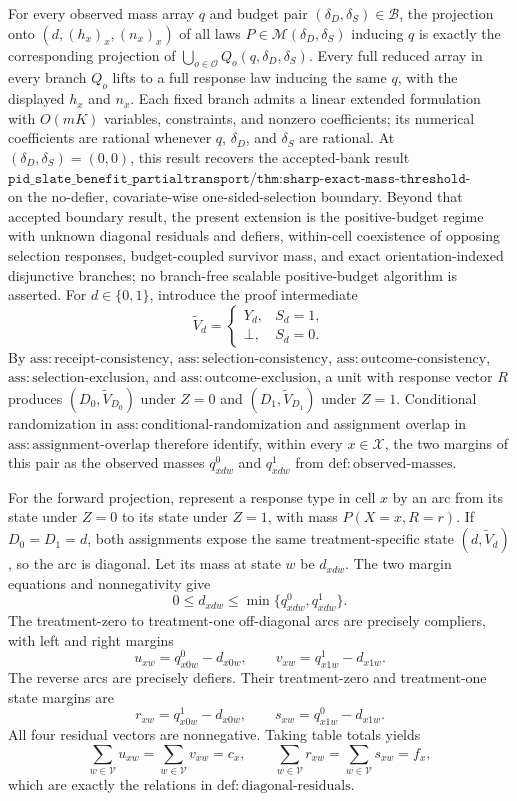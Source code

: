 For every observed mass array \(q\) and budget pair \((\delta_D,\delta_S)\in\mathcal B\), the projection onto \((d,(h_x)_x,(n_x)_x)\) of all laws \(P\in\mathcal M(\delta_D,\delta_S)\) inducing \(q\) is exactly the corresponding projection of \(\bigcup_{o\in\mathcal O}Q_o(q,\delta_D,\delta_S)\). Every full reduced array in every branch \(Q_o\) lifts to a full response law inducing the same \(q\), with the displayed \(h_x\) and \(n_x\). Each fixed branch admits a linear extended formulation with \(O(mK)\) variables, constraints, and nonzero coefficients; its numerical coefficients are rational whenever \(q\), \(\delta_D\), and \(\delta_S\) are rational. At \((\delta_D,\delta_S)=(0,0)\), this result recovers the accepted-bank result \(\texttt{pid\_slate\_benefit\_partialtransport/thm:sharp-exact-mass-threshold-interval}\) on the no-defier, covariate-wise one-sided-selection boundary. Beyond that accepted boundary result, the present extension is the positive-budget regime with unknown diagonal residuals and defiers, within-cell coexistence of opposing selection responses, budget-coupled survivor mass, and exact orientation-indexed disjunctive branches; no branch-free scalable positive-budget algorithm is asserted.
For \(d\in\{0,1\}\), introduce the proof intermediate
\[
 \widetilde V_d=
 \begin{cases}
 Y_d,&S_d=1,\\
 \bot,&S_d=0.
 \end{cases}
\]
By \(\mathrm{ass:receipt\text{-}consistency}\), \(\mathrm{ass:selection\text{-}consistency}\), \(\mathrm{ass:outcome\text{-}consistency}\), \(\mathrm{ass:selection\text{-}exclusion}\), and \(\mathrm{ass:outcome\text{-}exclusion}\), a unit with response vector \(R\) produces \((D_0,\widetilde V_{D_0})\) under \(Z=0\) and \((D_1,\widetilde V_{D_1})\) under \(Z=1\). Conditional randomization in \(\mathrm{ass:conditional\text{-}randomization}\) and assignment overlap in \(\mathrm{ass:assignment\text{-}overlap}\) therefore identify, within every \(x\in\mathcal X\), the two margins of this pair as the observed masses \(q^0_{xdw}\) and \(q^1_{xdw}\) from \(\mathrm{def:observed\text{-}masses}\).

For the forward projection, represent a response type in cell \(x\) by an arc from its state under \(Z=0\) to its state under \(Z=1\), with mass \(P(X=x,R=r)\). If \(D_0=D_1=d\), both assignments expose the same treatment-specific state \((d,\widetilde V_d)\), so the arc is diagonal. Let its mass at state \(w\) be \(d_{xdw}\). The two margin equations and nonnegativity give
\[
 0\leq d_{xdw}\leq\min\{q^0_{xdw},q^1_{xdw}\}.
\]
The treatment-zero to treatment-one off-diagonal arcs are precisely compliers, with left and right margins
\[
 u_{xw}=q^0_{x0w}-d_{x0w},
 \qquad
 v_{xw}=q^1_{x1w}-d_{x1w}.
\]
The reverse arcs are precisely defiers. Their treatment-zero and treatment-one state margins are
\[
 r_{xw}=q^1_{x0w}-d_{x0w},
 \qquad
 s_{xw}=q^0_{x1w}-d_{x1w}.
\]
All four residual vectors are nonnegative. Taking table totals yields
\[
 \sum_{w\in\mathcal V}u_{xw}
 =\sum_{w\in\mathcal V}v_{xw}=c_x,
 \qquad
 \sum_{w\in\mathcal V}r_{xw}
 =\sum_{w\in\mathcal V}s_{xw}=f_x,
\]
which are exactly the relations in \(\mathrm{def:diagonal\text{-}residuals}\).

